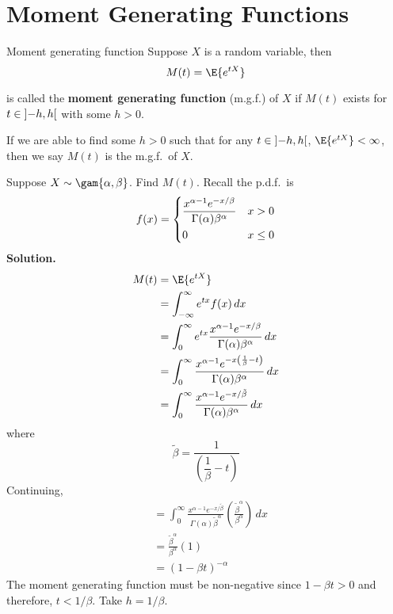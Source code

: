 \section{Moment Generating Functions}
\begin{Definition}{Moment generating function}{}
    Suppose $ X $ is a random variable, then
    \[ M(t)=\E{e^{tX}} \]

    is called the \textbf{moment generating function} (m.g.f.) of $ X $
    if $ M(t) $ exists for $ t\in\interval[open]{-h}{h} $ with some $ h>0 $.
\end{Definition}
\begin{Remark}{}{}
    If we are able to find some $ h>0 $ such that for any
    $ t\in\interval[open]{-h}{h} $,
    $ \E{e^{tX}}<\infty $, then we
    say $ M(t) $ is the m.g.f.\ of $ X $.
\end{Remark}

\begin{Example}{}{}
    Suppose $ X \sim \gam{\alpha,\beta}$.
    Find $ M(t) $.
    Recall the p.d.f.\ is
    \[ f(x)=\begin{dcases}
            \frac{x^{\alpha-1}e^{-x/\beta}}{\Gamma(\alpha)\beta^\alpha} & x>0    \\
            0                                                           & x\le 0
        \end{dcases}
    \]
    \textbf{Solution.}
    \begin{align*}
        M(t)
         & =\E{e^{tX}}                                                                                     \\
         & =\int_{-\infty}^{\infty} e^{tx}f(x)\, d{x}                                                      \\
         & =\int_{0}^{\infty} e^{tx} \frac{x^{\alpha-1}e^{-x/\beta}}{
        \Gamma(\alpha)\beta^\alpha
        } \, d{x}                                                                                          \\
         & =\int_{0}^{\infty} \frac{x^{\alpha-1}e^{-x\left( \frac{1}{\beta} -t \right)}}{
        \Gamma(\alpha)\beta^\alpha
        } \, d{x}                                                                                          \\
         & = \int_{0}^{\infty} \frac{x^{\alpha-1}e^{-x/\tilde{\beta}}}{\Gamma(\alpha)\beta^\alpha} \, d{x}
    \end{align*}
    where
    \[ \tilde{\beta}=\dfrac{1}{\left(\dfrac{1}{\beta}-t\right)}  \]
    Continuing,
    \begin{align*}
         & =\int_{0}^{\infty} \frac{x^{\alpha-1}e^{-x/\tilde{\beta}}}{\Gamma(\alpha)
        \tilde{\beta}^\alpha} \left( \frac{\tilde{\beta}^\alpha}{\beta^\alpha} \right)  \, d{x} \\
         & =\frac{\tilde{\beta}^\alpha}{\beta^\alpha}(1)                                        \\
         & =\left( 1-\beta t \right)^{-\alpha}
    \end{align*}
    The moment generating function must be non-negative since
    $ 1-\beta t>0 $ and therefore, $ t<1/\beta $. Take $ h=1/\beta $.
\end{Example}

